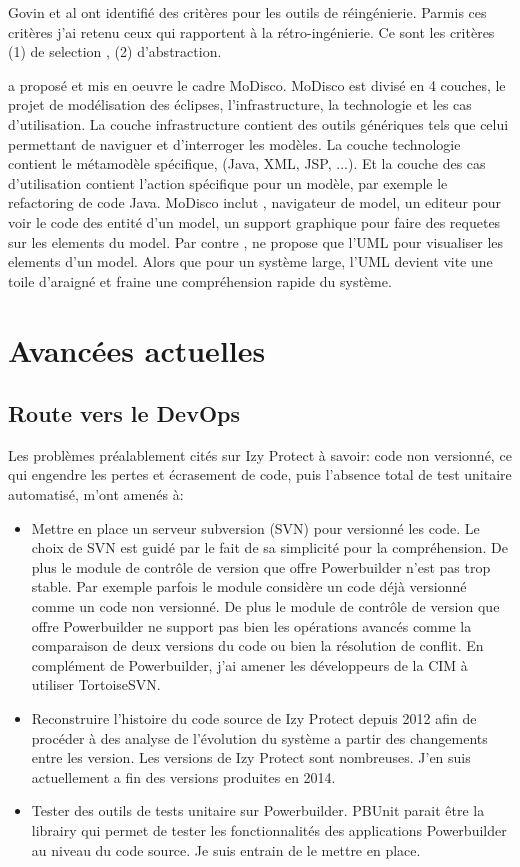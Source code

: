 \documentclass[a4paper]{article}
\begin{document}
Govin et al \cite{Govi18a} ont identifié des critères pour les outils de  réingénierie. 
Parmis ces critères  j'ai retenu ceux qui rapportent à la rétro-ingénierie.
Ce sont les critères (1) de selection , (2) d'abstraction. 

\citet{Brun14c} a proposé et mis en oeuvre le cadre MoDisco.
MoDisco est divisé en 4 couches, le projet de modélisation des éclipses, l'infrastructure, la technologie et les cas d'utilisation.
La couche infrastructure contient des outils génériques tels que celui permettant de naviguer et d'interroger les modèles.
La couche technologie contient le métamodèle spécifique, (Java, XML, JSP, ...).
Et la couche des cas d'utilisation contient l'action spécifique pour un modèle, par exemple le refactoring de code Java. 
MoDisco inclut , navigateur de model, un editeur pour voir le code des entité d'un model, un support graphique pour faire des requetes sur les elements du model. 
Par contre \citet{Brun14c}, ne propose que l'UML pour visualiser les elements d'un model.
Alors que pour un système large, l'UML devient vite une toile d'araigné et fraine une compréhension rapide du système.


\section{Avancées actuelles}
\subsection{Route vers le DevOps}
\label{sec: devOps}
Les problèmes préalablement cités sur Izy Protect à savoir: code non versionné, ce qui engendre les pertes et écrasement de code, puis l'absence total de test unitaire automatisé, m'ont amenés à:
\begin{itemize}
\item Mettre en place un serveur subversion (SVN) pour versionné les code. 
Le choix de SVN est guidé par le fait  de sa simplicité  pour la compréhension.  
De plus le module de contrôle de version que offre Powerbuilder n'est pas trop stable. 
Par exemple parfois le module considère un code déjà versionné comme un code non versionné.
 De plus le module de contrôle de version que offre Powerbuilder ne support pas bien les opérations avancés comme la comparaison de deux versions du code ou bien la résolution de conflit. En complément de Powerbuilder,  j'ai amener les développeurs de la CIM à utiliser TortoiseSVN.
\item Reconstruire l'histoire du code source de Izy Protect depuis 2012 afin de procéder à des analyse de l'évolution du système a partir des changements entre les version. Les versions de Izy Protect sont nombreuses. J'en suis actuellement a fin des versions produites en 2014.
\item Tester  des outils de tests unitaire sur Powerbuilder. PBUnit parait être la librairy qui permet de tester  les fonctionnalités des applications Powerbuilder au niveau du code source. 
Je suis entrain de le mettre en place.
\end{itemize}
\end{document}
